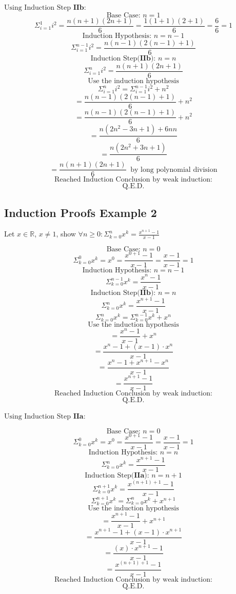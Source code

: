 \documentclass{article}
\begin{document}
$\text{Using Induction Step } \textbf{IIb}:$
$$\text{Base Case: } n = 1$$
$$\Sigma_{i=1}^{1} i^2 = \frac{n(n+1)(2n+1)}{6} = \frac{1(1+1)(2+1)}{6} = \frac{6}{6} = 1$$
$$\text{Induction Hypothesis: } n = n - 1$$
$$\Sigma_{i=1}^{n-1} i^2 = \frac{n(n-1)(2(n-1)+1)}{6}$$
$$\text{Induction Step(} \textbf{IIb} \text{): } n = n$$
$$\Sigma_{i=1}^{n} i^2 = \frac{n(n+1)(2n+1)}{6}$$
$$\text{Use the induction hypothesis}$$
$$\Sigma_{i=1}^{n} i^2 = \Sigma_{i=1}^{n-1} i^2 + n^2$$
$$= \frac{n(n-1)(2(n-1)+1)}{6} + n^2$$
$$= \frac{n(n-1)(2(n-1)+1)}{6} + n^2$$
$$= \frac{n(2n^2 - 3n +1) + 6nn}{6}$$
$$= \frac{n(2n^2 + 3n +1)}{6}$$
$$= \frac{n(n+1)(2n + 1)}{6}\;\;\text{by long polynomial division}$$
$$\text{Reached Induction Conclusion by weak induction:}$$
$$\text{Q.E.D.}$$

\subsection{Induction Proofs Example 2}
Let $x \in \mathbb{R}$, $x \neq 1$, show $\forall n \ge 0: \Sigma_{k = 0}^{n} x^k = \frac{x^{n+1} - 1}{x - 1}$


$$\text{Base Case: } n = 0$$
$$\Sigma_{k = 0}^{0} x^k = x^0 = \frac{x^{0 + 1} - 1}{x - 1} = \frac{x - 1}{x - 1} = 1$$
$$\text{Induction Hypothesis: } n = n - 1$$
$$\Sigma_{k = 0}^{n-1} x^k = \frac{x^{n} - 1}{x - 1}$$
$$\text{Induction Step(} \textbf{IIb} \text{): } n = n$$
$$\Sigma_{k = 0}^{n} x^k = \frac{x^{n + 1} - 1}{x - 1}$$
$$\Sigma_{k = 0}^{n} x^k = \Sigma_{k = 0}^{n-1} x^k + x^{n}$$
$$\text{Use the induction hypothesis}$$
$$= \frac{x^{n} - 1}{x - 1} + x^{n}$$
$$= \frac{x^{n} - 1 + (x-1)\cdot x^{n}}{x - 1}$$
$$= \frac{x^{n} - 1 + x^{n+1} - x^n}{x - 1}$$
$$= \frac{x^{n+1} - 1}{x - 1}$$
$$\text{Reached Induction Conclusion by weak induction:}$$
$$\text{Q.E.D.}$$

$\text{Using Induction Step } \textbf{IIa}:$

$$\text{Base Case: } n = 0$$
$$\Sigma_{k = 0}^{0} x^k = x^0 = \frac{x^{0 + 1} - 1}{x - 1} = \frac{x - 1}{x - 1} = 1$$
$$\text{Induction Hypothesis: } n = n $$
$$\Sigma_{k = 0}^{n} x^k = \frac{x^{n + 1} - 1}{x - 1}$$
$$\text{Induction Step(} \textbf{IIa} \text{): } n = n + 1$$
$$\Sigma_{k = 0}^{n+1} x^k = \frac{x^{(n+1) + 1} - 1}{x - 1}$$
$$\Sigma_{k = 0}^{n+1} x^k = \Sigma_{k = 0}^{n} x^k + x^{n+1}$$
$$\text{Use the induction hypothesis}$$
$$= \frac{x^{n+1} - 1}{x - 1} + x^{n+1}$$
$$= \frac{x^{n+1} - 1 + (x-1)\cdot x^{n+1}} {x - 1}$$
$$= \frac{(x) \cdot x^{n+1} - 1} {x - 1}$$
$$= \frac{x^{(n+1) + 1} - 1} {x - 1}$$
$$\text{Reached Induction Conclusion by weak induction:}$$
$$\text{Q.E.D.}$$
\end{document}
